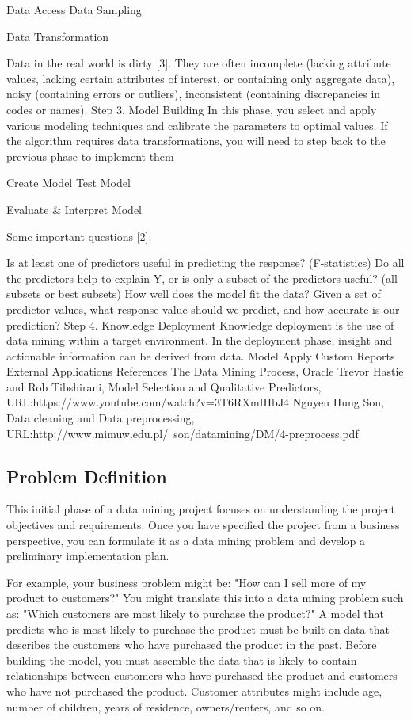  Data Access
 Data Sampling

 Data Transformation

Data in the real world is dirty [3]. They are often incomplete (lacking attribute values, lacking certain attributes of interest, or containing only aggregate data), noisy (containing errors or outliers), inconsistent (containing discrepancies in codes or names). Step 3. Model Building In this phase, you select and apply various modeling techniques and calibrate the parameters to optimal values. If the algorithm requires data transformations, you will need to step back to the previous phase to implement them

 Create Model
 Test Model

  Evaluate & Interpret Model

Some important questions [2]:

Is at least one of predictors useful in predicting the response? (F-statistics)
Do all the predictors help to explain Y, or is only a subset of the predictors useful? (all subsets or best subsets)
How well does the model fit the data?
Given a set of predictor values, what response value should we predict, and how accurate is our prediction?
Step 4. Knowledge Deployment Knowledge deployment is the use of data mining within a target environment. In the deployment phase, insight and actionable information can be derived from data.
Model Apply
Custom Reports
External Applications
References
The Data Mining Process, Oracle
Trevor Hastie and Rob Tibshirani, Model Selection and Qualitative Predictors, URL:https://www.youtube.com/watch?v=3T6RXmIHbJ4
Nguyen Hung Son, Data cleaning and Data preprocessing, URL:http://www.mimuw.edu.pl/~son/datamining/DM/4-preprocess.pdf

\subsection{Problem Definition}

This initial phase of a data mining project focuses on understanding the project objectives and requirements. Once you have specified the project from a business perspective, you can formulate it as a data mining problem and develop a preliminary implementation plan.

For example, your business problem might be: "How can I sell more of my product to customers?" You might translate this into a data mining problem such as: "Which customers are most likely to purchase the product?" A model that predicts who is most likely to purchase the product must be built on data that describes the customers who have purchased the product in the past. Before building the model, you must assemble the data that is likely to contain relationships between customers who have purchased the product and customers who have not purchased the product. Customer attributes might include age, number of children, years of residence, owners/renters, and so on.

